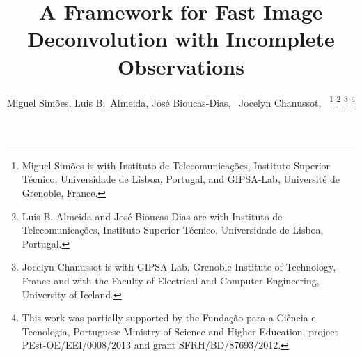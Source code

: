 \documentclass[10pt,twocolumn,twoside]{IEEEtran}
\begin{document}
%
\title{A Framework for Fast Image Deconvolution with Incomplete Observations}
%
%
%

\author{Miguel Sim\~{o}es, Luis B.\ Almeida, Jos\'{e} Bioucas-Dias,~ Jocelyn Chanussot,~%
\thanks{Miguel Sim\~{o}es is with Instituto de Telecomunica\c{c}\~{o}es, Instituto
Superior T\'{e}cnico, Universidade de Lisboa, Portugal, and GIPSA-Lab, Universit\'{e} de Grenoble, France.}%
\thanks{Luis B. Almeida and Jos\'{e} Bioucas-Dias are with Instituto de Telecomunica\c{c}\~{o}es, Instituto
Superior T\'{e}cnico, Universidade de Lisboa, Portugal.}%
\thanks{Jocelyn Chanussot is with GIPSA-Lab, Grenoble Institute of Technology, France and with the Faculty of Electrical and Computer Engineering, University of Iceland.}%
\thanks{This work was partially supported by the Funda\c{c}\~{a}o para a Ci\^{e}ncia e Tecnologia, Portuguese Ministry of Science and Higher Education, project PEst-OE/EEI/0008/2013 and grant SFRH/BD/87693/2012.}}

%
%
\end{document}
